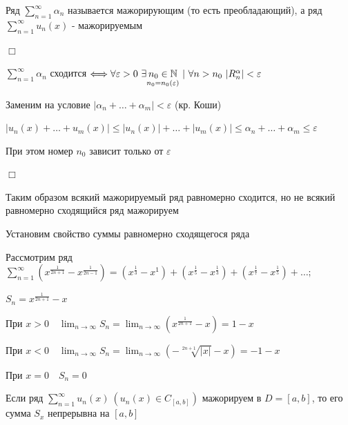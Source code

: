 \documentclass[12pt]{article}
\begin{document}
    \Nota Ряд $\sum_{n = 1}^\infty \alpha_n$ называется мажорирующим (то есть преобладающий), 
    а ряд $\sum_{n = 1}^\infty u_n(x)$ - мажорируемым

    \begin{MyProof}
        $\Box$

        $\sum_{n = 1}^\infty \alpha_n$ сходится $\Longleftrightarrow \forall \varepsilon > 0 \ \exists \underset{n_0 = n_0(\varepsilon)}{n_0 \in \mathbb{N}} \ | \
        \forall n > n_0 \ |R_n^\alpha| < \varepsilon$

        Заменим на условие $|\alpha_n + \dots + \alpha_m| < \varepsilon$ (кр. Коши)

        $|u_n(x) + \dots + u_m(x)| \leq |u_n(x)| + \dots + |u_m(x)| \leq \alpha_n + \dots + \alpha_m \leq \varepsilon$

        При этом номер $n_0$ зависит только от $\varepsilon$

        $\Box$
    \end{MyProof}

    \Nota Таким образом всякий мажорируемый ряд равномерно сходится, но не всякий равномерно сходящийся ряд мажорируем

    \Nota Установим свойство суммы равномерно сходящегося ряда

    \Exs Рассмотрим ряд $\sum_{n = 1}^\infty (x^{\frac{1}{2n + 1}} - x^{\frac{1}{2n - 1}}) = (x^\frac{1}{3} - x^1) + (x^\frac{1}{5} - x^\frac{1}{3}) + (x^\frac{1}{7} - x^\frac{1}{5}) + \dots;$

    $S_n = x^\frac{1}{2n + 1} - x$

    При $x > 0 \quad \lim_{n \to \infty} S_n = \lim_{n \to \infty} (x^\frac{1}{2n + 1} - x) = 1 - x$

    При $x < 0 \quad \lim_{n \to \infty} S_n = \lim_{n \to \infty} (-\sqrt[2n + 1]{|x|} - x) = -1 - x$

    При $x = 0 \quad S_n = 0$


    \begin{MyTheorem}
        \Ths Если ряд $\sum_{n = 1}^\infty u_n(x) \ (u_n(x) \in C_{[a, b]})$ мажорируем в $D = [a, b]$, то 
        его сумма $S_x$ непрерывна на $[a, b]$
    \end{MyTheorem}
\end{document}
